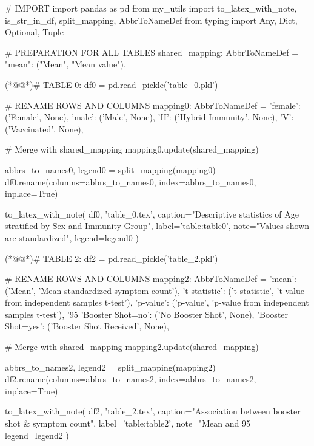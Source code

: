 \documentclass[11pt]{article}
\begin{document}
\begin{python}

# IMPORT
import pandas as pd
from my_utils import to_latex_with_note, is_str_in_df, split_mapping, AbbrToNameDef
from typing import Any, Dict, Optional, Tuple

# PREPARATION FOR ALL TABLES
shared_mapping: AbbrToNameDef = {
    "mean": ("Mean", "Mean value"),
}

(*@@*)# TABLE 0:
df0 = pd.read_pickle('table_0.pkl')

# RENAME ROWS AND COLUMNS 
mapping0: AbbrToNameDef = {
    'female': ('Female', None),
    'male': ('Male', None),
    'H': ('Hybrid Immunity', None),
    'V': ('Vaccinated', None), 
}

# Merge with shared_mapping
mapping0.update(shared_mapping)

abbrs_to_names0, legend0 = split_mapping(mapping0)
df0.rename(columns=abbrs_to_names0, index=abbrs_to_names0, inplace=True)

to_latex_with_note(
    df0, 'table_0.tex',
    caption="Descriptive statistics of Age stratified by Sex and Immunity Group", 
    label='table:table0',
    note="Values shown are standardized",
    legend=legend0
)


(*@@*)# TABLE 2:
df2 = pd.read_pickle('table_2.pkl')

# RENAME ROWS AND COLUMNS 
mapping2: AbbrToNameDef = {
    'mean': ('Mean', 'Mean standardized symptom count'),
    't-statistic': ('t-statistic', 't-value from independent samples t-test'),
    'p-value': ('p-value', 'p-value from independent samples t-test'),
    '95%
    'Booster Shot=no': ('No Booster Shot', None),
    'Booster Shot=yes': ('Booster Shot Received', None),
}

# Merge with shared_mapping
mapping2.update(shared_mapping)

abbrs_to_names2, legend2 = split_mapping(mapping2)
df2.rename(columns=abbrs_to_names2, index=abbrs_to_names2, inplace=True)

to_latex_with_note(
    df2, 'table_2.tex',
    caption="Association between booster shot & symptom count", 
    label='table:table2',
    note="Mean and 95%
    legend=legend2
)

\end{python}
\end{document}

